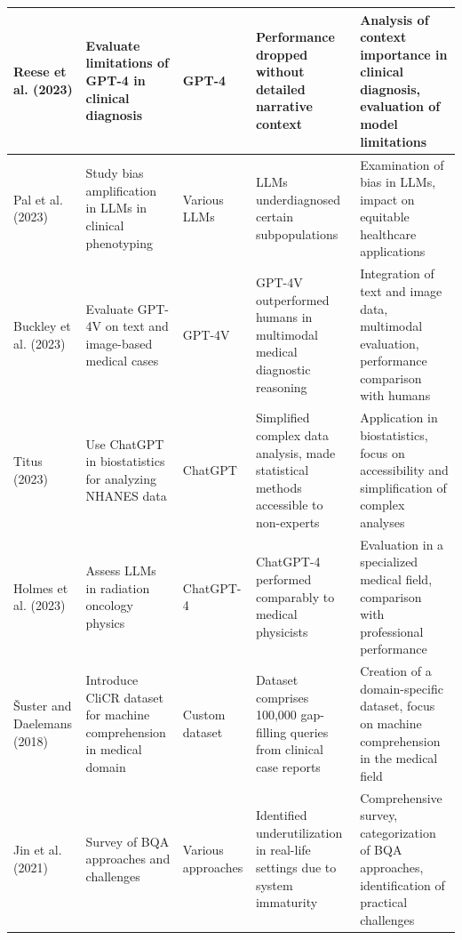 \documentclass[onecolumn, conference]{IEEEtran}
\begin{document}
\begin{table}[ht]
\begin{tabularx}{\textwidth}{|X|X|X|X|X|}
    \hline
    Reese et al. (2023) \cite{Reese2023}          & Evaluate limitations of GPT-4 in clinical diagnosis                 & GPT-4                          & Performance dropped without detailed narrative context                                     & Analysis of context importance in clinical diagnosis, evaluation of model limitations                               \\
    \hline
    Pal et al. (2023) \cite{Pal2023}              & Study bias amplification in LLMs in clinical phenotyping            & Various LLMs                   & LLMs underdiagnosed certain subpopulations                                                 & Examination of bias in LLMs, impact on equitable healthcare applications                                            \\
    \hline
    Buckley et al. (2023) \cite{Buckley2023}      & Evaluate GPT-4V on text and image-based medical cases               & GPT-4V                         & GPT-4V outperformed humans in multimodal medical diagnostic reasoning                      & Integration of text and image data, multimodal evaluation, performance comparison with humans                       \\
    \hline
    Titus (2023) \cite{Titus2023}                 & Use ChatGPT in biostatistics for analyzing NHANES data              & ChatGPT                        & Simplified complex data analysis, made statistical methods accessible to non-experts       & Application in biostatistics, focus on accessibility and simplification of complex analyses                         \\
    \hline
    Holmes et al. (2023) \cite{Holmes2023a}       & Assess LLMs in radiation oncology physics                           & ChatGPT-4                      & ChatGPT-4 performed comparably to medical physicists                                       & Evaluation in a specialized medical field, comparison with professional performance                                 \\
    \hline
    Šuster and Daelemans (2018) \cite{Suster2018} & Introduce CliCR dataset for machine comprehension in medical domain & Custom dataset                 & Dataset comprises 100,000 gap-filling queries from clinical case reports                   & Creation of a domain-specific dataset, focus on machine comprehension in the medical field                          \\
    \hline
    Jin et al. (2021) \cite{Jin2021}              & Survey of BQA approaches and challenges                             & Various approaches             & Identified underutilization in real-life settings due to system immaturity                 & Comprehensive survey, categorization of BQA approaches, identification of practical challenges                      \\

\end{tabularx}
\end{table}
\end{document}
